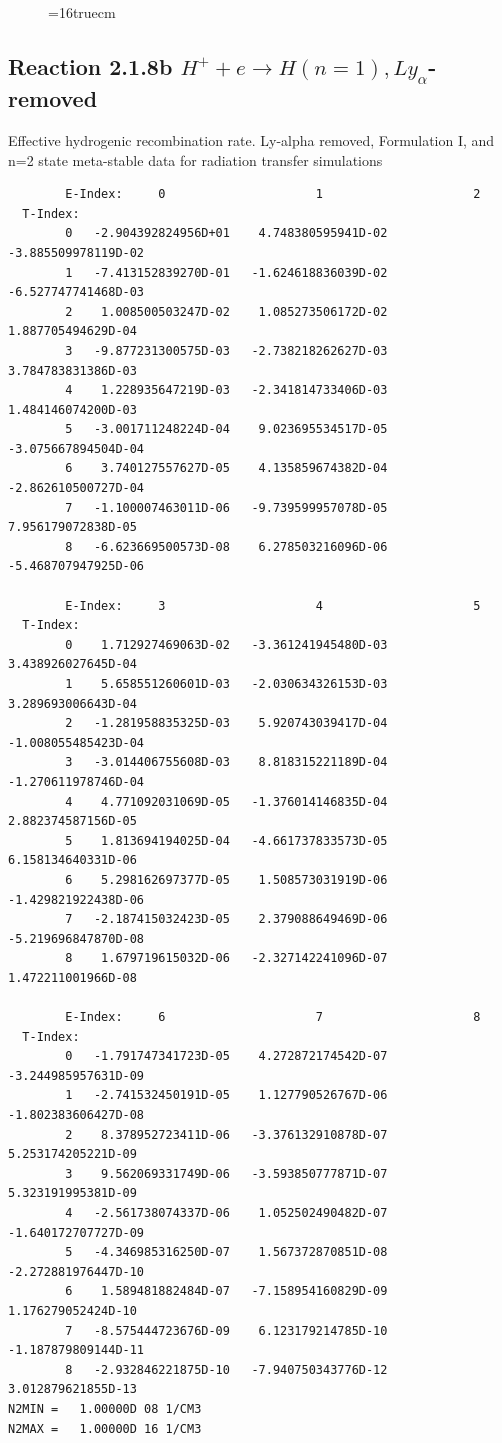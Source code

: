 \documentclass[12pt,dvipdfmx]{article}
\begin{document}
\begin{figure} \label{2.1.8a}
\epsfxsize=16truecm
\end{figure}
\newpage
\subsection{
Reaction 2.1.8b  $H^+ + e \rightarrow H(n=1), Ly_\alpha$-removed
}


   Effective hydrogenic recombination rate.
   Ly-alpha removed, Formulation I, and n=2 state meta-stable
   data for radiation transfer simulations

\begin{small}\begin{verbatim}
        E-Index:     0                     1                     2
  T-Index:
        0   -2.904392824956D+01    4.748380595941D-02   -3.885509978119D-02
        1   -7.413152839270D-01   -1.624618836039D-02   -6.527747741468D-03
        2    1.008500503247D-02    1.085273506172D-02    1.887705494629D-04
        3   -9.877231300575D-03   -2.738218262627D-03    3.784783831386D-03
        4    1.228935647219D-03   -2.341814733406D-03    1.484146074200D-03
        5   -3.001711248224D-04    9.023695534517D-05   -3.075667894504D-04
        6    3.740127557627D-05    4.135859674382D-04   -2.862610500727D-04
        7   -1.100007463011D-06   -9.739599957078D-05    7.956179072838D-05
        8   -6.623669500573D-08    6.278503216096D-06   -5.468707947925D-06

        E-Index:     3                     4                     5
  T-Index:
        0    1.712927469063D-02   -3.361241945480D-03    3.438926027645D-04
        1    5.658551260601D-03   -2.030634326153D-03    3.289693006643D-04
        2   -1.281958835325D-03    5.920743039417D-04   -1.008055485423D-04
        3   -3.014406755608D-03    8.818315221189D-04   -1.270611978746D-04
        4    4.771092031069D-05   -1.376014146835D-04    2.882374587156D-05
        5    1.813694194025D-04   -4.661737833573D-05    6.158134640331D-06
        6    5.298162697377D-05    1.508573031919D-06   -1.429821922438D-06
        7   -2.187415032423D-05    2.379088649469D-06   -5.219696847870D-08
        8    1.679719615032D-06   -2.327142241096D-07    1.472211001966D-08

        E-Index:     6                     7                     8
  T-Index:
        0   -1.791747341723D-05    4.272872174542D-07   -3.244985957631D-09
        1   -2.741532450191D-05    1.127790526767D-06   -1.802383606427D-08
        2    8.378952723411D-06   -3.376132910878D-07    5.253174205221D-09
        3    9.562069331749D-06   -3.593850777871D-07    5.323191995381D-09
        4   -2.561738074337D-06    1.052502490482D-07   -1.640172707727D-09
        5   -4.346985316250D-07    1.567372870851D-08   -2.272881976447D-10
        6    1.589481882484D-07   -7.158954160829D-09    1.176279052424D-10
        7   -8.575444723676D-09    6.123179214785D-10   -1.187879809144D-11
        8   -2.932846221875D-10   -7.940750343776D-12    3.012879621855D-13
N2MIN =   1.00000D 08 1/CM3
N2MAX =   1.00000D 16 1/CM3


\end{verbatim}
\end{small}
\end{document}
